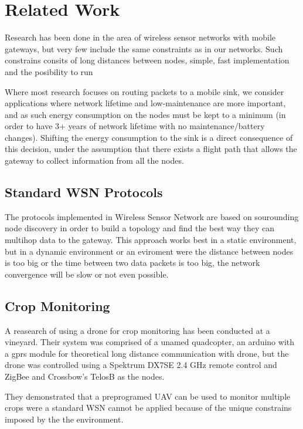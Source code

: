 \normalfont\normalsize
\chapter{Related Work}

Research has been done in the area of wireless sensor networks with mobile gateways, but very few include the same constraints as in our networks. Such constrains consits of long distances between nodes, simple, fast implementation and the posibility to run 

Where most research focuses on routing packets to a mobile sink, we consider applications where network lifetime and low-maintenance are more important, and as such energy consumption on the nodes must be kept to a minimum (in order to have 3+ years of network lifetime
with no maintenance/battery changes). Shifting the energy consumption to the sink is a direct consequence of this decision, under the assumption that there exists a flight path that allows the gateway to collect information from all the nodes.

\section{Standard WSN Protocols}

The protocols implemented in Wireless Sensor Network are based on sourounding node discovery in order to build a topology and find the best way they can multihop data to the gateway. This approach works best in a static environment, but in a dynamic environment or an eviroment were the distance between nodes is too big or the time between two data packets is too big, the network convergence will be slow or not even possible.

\section{Crop Monitoring}

A reasearch of using a drone for crop monitoring has been conducted at a vineyard. Their system was comprised of a unamed quadcopter, an arduino with a gprs module for theoretical long distance communication with drone, but the drone was controlled using a Spektrum DX7SE 2.4 GHz remote control and ZigBee and Crossbow’s TelosB as the nodes.

They demonstrated that a preprogramed UAV can be used to monitor multiple crops were a standard WSN cannot be applied because of the unique constrains imposed by the the environment.

